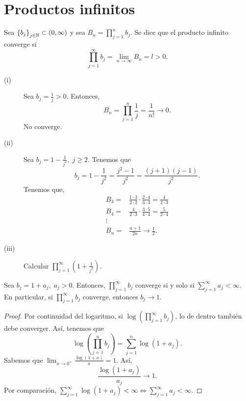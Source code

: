 \chapter{Productos infinitos}

Sea $\displaystyle \left\{ b_{j}\right\} _{j\in\mathbb{N}}\subset\left(0, \infty\right) $ y sea $\displaystyle B_{n} = \prod^{n}_{j=1}b_{j} $. Se dice que el producto infinito converge si 
\[\prod^{\infty}_{j=1}b_{j} = \lim_{n \to \infty}B_{n} = l > 0 .\]

\begin{eg}
\normalfont 
\begin{description}
\item[(i)] Sea $\displaystyle b_{j} = \frac{1}{j} > 0 $. Entonces, 
\[B_{n} = \prod^{n}_{j=1}\frac{1}{j} = \frac{1}{n!} \to 0 .\]
No converge. 
\item[(ii)] Sea $\displaystyle b_{j}= 1 - \frac{1}{j^{2}}, \; j \geq 2 $. Tenemos que 
	\[b_{j} = 1 - \frac{1}{j^{2}} = \frac{j^{2}-1}{j^{2}} = \frac{\left(j+1\right)\left(j-1\right)}{j^{2}} .\]
Tenemos que, 
\[
\begin{split}
	B_{3} = & \frac{1 \cdot 3}{2 \cdot 2} \cdot \frac{2 \cdot 4}{3 \cdot 3} = \frac{4}{2 \cdot 3} \\
	B_{4} = & \frac{4}{2 \cdot 3} \cdot \frac{3 \cdot 5}{4 \cdot 4} = \frac{5}{2 \cdot 4} \\
	\vdots & \\
	B_{n} = & \frac{n+1}{2n} \to \frac{1}{2}.
\end{split}
\]
\item[(iii)] Calcular $\displaystyle \prod^{\infty}_{j=1}\left(1 +\frac{1}{j^{2}}\right) $.
\end{description}
\end{eg}

\begin{ftheorem}[]
	\normalfont Sea $\displaystyle b_{j} = 1 + a_{j}, \; a_{j}>0 $. Entonces, $\displaystyle \prod^{\infty}_{j=1}b_{j} $ converge si y solo si $\displaystyle \sum^{\infty}_{j=1}a_{j} < \infty $. En particular, si $\displaystyle \prod^{\infty}_{j=1}b_{j} $ converge, entonces $\displaystyle b_{j} \to 1 $.
\end{ftheorem}

\begin{proof}
Por continuidad del logaritmo, si $\displaystyle \log\left(\prod^{\infty}_{j=1}b_{j}\right) $, lo de dentro también debe converger. Así, tenemos que
\[\log\left(\prod^{n}_{j=1}b_{j}\right) = \sum^{n}_{j=1}\log\left(1+a_{j}\right) .\]
Sabemos que $\displaystyle \lim_{x \to 0^{+}}\frac{\log\left(1 + x\right)}{x} = 1 $. Así,
\[\frac{\log\left(1 + a_{j}\right)}{a_{j}}\to 1 .\]
Por comparación, $\displaystyle \sum^{\infty}_{j=1}\log\left(1+a_{j}\right) < \infty \iff \sum^{\infty}_{j=1}a_{j} < \infty $.
\end{proof}

